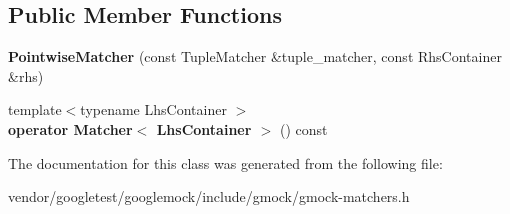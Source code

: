 \subsection*{Public Member Functions}
\begin{DoxyCompactItemize}
\item 
\mbox{\label{classtesting_1_1internal_1_1_pointwise_matcher_aa6e63218a93062d5055428462417821f}} 
{\bfseries Pointwise\+Matcher} (const Tuple\+Matcher \&tuple\+\_\+matcher, const Rhs\+Container \&rhs)
\item 
\mbox{\label{classtesting_1_1internal_1_1_pointwise_matcher_a50b68745b7fea83ab076b22fa0497e7d}} 
{\footnotesize template$<$typename Lhs\+Container $>$ }\\{\bfseries operator Matcher$<$ Lhs\+Container $>$} () const
\end{DoxyCompactItemize}


The documentation for this class was generated from the following file\+:\begin{DoxyCompactItemize}
\item 
vendor/googletest/googlemock/include/gmock/gmock-\/matchers.\+h\end{DoxyCompactItemize}
